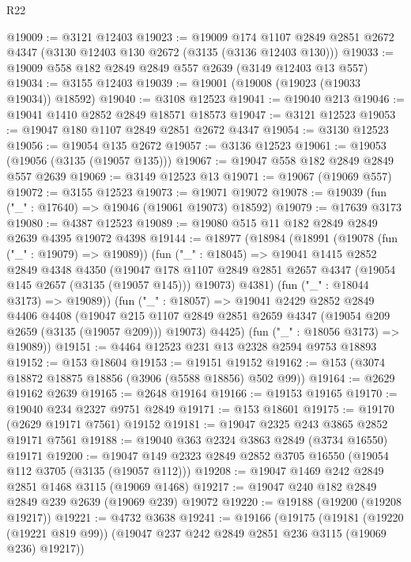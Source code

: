\begin{lexlean}{R22}
\begin{coremodule}
@19009 := @3121 @12403
@19023 := @19009
    @174
    @1107
    @2849
    @2851
    @2672
    @4347
    (@3130 @12403 @130 @2672 (@3135 (@3136 @12403 @130)))
@19033 := @19009 @558 @182 @2849 @2849 @557 @2639 (@3149 @12403 @13 @557)
@19034 := @3155 @12403
@19039 := @19001 (@19008 (@19023 (@19033 @19034)) @18592)
@19040 := @3108 @12523
@19041 := @19040 @213
@19046 := @19041 @1410 @2852 @2849 @18571 @18573
@19047 := @3121 @12523
@19053 := @19047 @180 @1107 @2849 @2851 @2672 @4347
@19054 := @3130 @12523
@19056 := @19054 @135 @2672
@19057 := @3136 @12523
@19061 := @19053 (@19056 (@3135 (@19057 @135)))
@19067 := @19047 @558 @182 @2849 @2849 @557 @2639
@19069 := @3149 @12523 @13
@19071 := @19067 (@19069 @557)
@19072 := @3155 @12523
@19073 := @19071 @19072
@19078 := @19039 (fun ("_" : @17640) => @19046 (@19061 @19073) @18592)
@19079 := @17639 @3173
@19080 := @4387 @12523
@19089 := @19080 @515 @11 @182 @2849 @2849 @2639 @4395 @19072 @4398
@19144 := @18977
    (@18984
      (@18991
        (@19078 (fun ("_" : @19079) => @19089))
        (fun ("_" : @18045) =>
        @19041
          @1415
          @2852
          @2849
          @4348
          @4350
          (@19047
            @178
            @1107
            @2849
            @2851
            @2657
            @4347
            (@19054 @145 @2657 (@3135 (@19057 @145)))
            @19073)
          @4381)
        (fun ("_" : @18044 @3173) => @19089))
      (fun ("_" : @18057) =>
      @19041
        @2429
        @2852
        @2849
        @4406
        @4408
        (@19047 @215 @1107 @2849 @2851 @2659 @4347 (@19054 @209 @2659 (@3135 (@19057 @209))) @19073)
        @4425)
      (fun ("_" : @18056 @3173) => @19089))
@19151 := @4464 @12523 @231 @13 @2328 @2594 @9753 @18893
@19152 := @153 @18604
@19153 := @19151 @19152
@19162 := @153 (@3074 @18872 @18875 @18856 (@3906 (@5588 @18856) @502 @99))
@19164 := @2629 @19162 @2639
@19165 := @2648 @19164
@19166 := @19153 @19165
@19170 := @19040 @234 @2327 @9751 @2849
@19171 := @153 @18601
@19175 := @19170 (@2629 @19171 @7561) @19152
@19181 := @19047 @2325 @243 @3865 @2852 @19171 @7561
@19188 := @19040 @363 @2324 @3863 @2849 (@3734 @16550) @19171
@19200 := @19047 @149 @2323 @2849 @2852 @3705 @16550 (@19054 @112 @3705 (@3135 (@19057 @112)))
@19208 := @19047 @1469 @242 @2849 @2851 @1468 @3115 (@19069 @1468)
@19217 := @19047 @240 @182 @2849 @2849 @239 @2639 (@19069 @239) @19072
@19220 := @19188 (@19200 (@19208 @19217))
@19221 := @4732 @3638
@19241 := @19166
    (@19175
      (@19181
        (@19220 (@19221 @819 @99))
        (@19047 @237 @242 @2849 @2851 @236 @3115 (@19069 @236) @19217))

\end{coremodule}
\end{lexlean}
